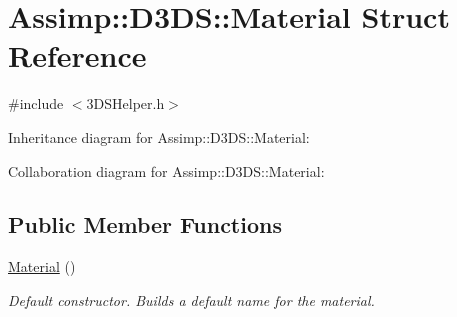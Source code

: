 \hypertarget{struct_assimp_1_1_d3_d_s_1_1_material}{\section{Assimp\+:\+:D3\+D\+S\+:\+:Material Struct Reference}
\label{struct_assimp_1_1_d3_d_s_1_1_material}
}


{\ttfamily \#include $<$3\+D\+S\+Helper.\+h$>$}



Inheritance diagram for Assimp\+:\+:D3\+D\+S\+:\+:Material\+:


Collaboration diagram for Assimp\+:\+:D3\+D\+S\+:\+:Material\+:
\subsection*{Public Member Functions}
\begin{DoxyCompactItemize}
\item 
\hypertarget{struct_assimp_1_1_d3_d_s_1_1_material_a6cce0885ec3e2df95be6fb0e46e1c0f3}{\hyperlink{struct_assimp_1_1_d3_d_s_1_1_material_a6cce0885ec3e2df95be6fb0e46e1c0f3}{Material} ()}\label{struct_assimp_1_1_d3_d_s_1_1_material_a6cce0885ec3e2df95be6fb0e46e1c0f3}

\begin{DoxyCompactList}\small\item\em Default constructor. Builds a default name for the material. \end{DoxyCompactList}\end{DoxyCompactItemize}
